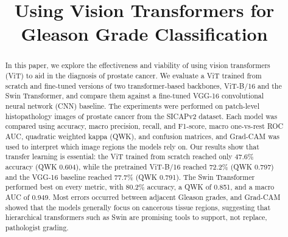 \documentclass[conference]{IEEEtran}
\begin{document}
\title{Using Vision Transformers for Gleason Grade Classification \\}

\author{
\and
{}
\and
{}
}

\maketitle

\begin{abstract}
In this paper, we explore the effectiveness and viability of using vision transformers (ViT) to aid in the diagnosis of prostate cancer. We evaluate a ViT trained from scratch and fine-tuned versions of two transformer-based backbones, ViT-B/16 and the Swin Transformer, and compare them against a fine-tuned VGG-16 convolutional neural network (CNN) baseline. The experiments were performed on patch-level histopathology images of prostate cancer from the SICAPv2 dataset. Each model was compared using accuracy, macro precision, recall, and F1-score, macro one-vs-rest ROC AUC, quadratic weighted kappa (QWK), and confusion matrices, and Grad-CAM was used to interpret which image regions the models rely on. Our results show that transfer learning is essential: the ViT trained from scratch reached only 47.6\% accuracy (QWK 0.604), while the pretrained ViT-B/16 reached 72.2\% (QWK 0.797) and the VGG-16 baseline reached 77.7\% (QWK 0.791). The Swin Transformer performed best on every metric, with 80.2\% accuracy, a QWK of 0.851, and a macro AUC of 0.949. Most errors occurred between adjacent Gleason grades, and Grad-CAM showed that the models generally focus on cancerous tissue regions, suggesting that hierarchical transformers such as Swin are promising tools to support, not replace, pathologist grading.
\end{abstract}
\end{document}
